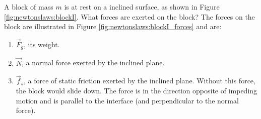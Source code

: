 \newpage
\begin{example}{\label{ex:newtonslaws:blockI} A block of mass $m$ is at rest on a inclined surface, as shown in Figure \ref{fig:newtonslaws:blockI}. What forces are exerted on the block?}
The forces on the block are illustrated in Figure \ref{fig:newtonslaws:blockI_forces} and are:
\begin{enumerate}
\item $\vec F_g$, its weight.
\item $\vec N$, a normal force exerted by the inclined plane.
\item $\vec f_s$, a force of static friction exerted by the inclined plane. Without this force, the block would slide down. The force is in the direction opposite of impeding motion and is parallel to the interface (and perpendicular to the normal force).
\end{enumerate}
\end{example}
\vspace{-0.25cm}
